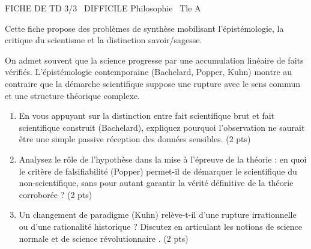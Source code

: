 \documentclass[11pt]{article}
\begin{document}
\begin{tcolorbox}[enhanced,colback=popink,colframe=popink,arc=10pt,boxrule=0pt,left=12pt,right=12pt,top=9pt,bottom=9pt]
{\color{white}\popxbold\small FICHE DE TD 3/3 \textbullet\ DIFFICILE \hfill Philosophie \textbullet\ Tle A\par}
\end{tcolorbox}
\vspace{4pt}
Cette fiche propose des problèmes de synthèse mobilisant l'épistémologie, la critique du scientisme et la distinction savoir/sagesse.

\begin{exercice}
On admet souvent que la science progresse par une accumulation linéaire de faits vérifiés. L'épistémologie contemporaine (Bachelard, Popper, Kuhn) montre au contraire que la démarche scientifique suppose une rupture avec le sens commun et une structure théorique complexe.

\begin{enumerate}
    \item En vous appuyant sur la distinction entre \og fait scientifique brut \fg{} et \og fait scientifique construit \fg{} (Bachelard), expliquez pourquoi l'observation ne saurait être une simple passive réception des données sensibles. \hfill (2 pts)
    \item Analysez le rôle de l'hypothèse dans la mise à l'épreuve de la théorie : en quoi le critère de falsifiabilité (Popper) permet-il de démarquer le scientifique du non-scientifique, sans pour autant garantir la vérité définitive de la théorie corroborée ? \hfill (2 pts)
    \item Un changement de paradigme (Kuhn) relève-t-il d'une rupture irrationnelle ou d'une rationalité historique ? Discutez en articulant les notions de \og science normale \fg{} et de \og science révolutionnaire \fg{}. \hfill (2 pts)
\end{enumerate}
\end{exercice}
\end{document}
